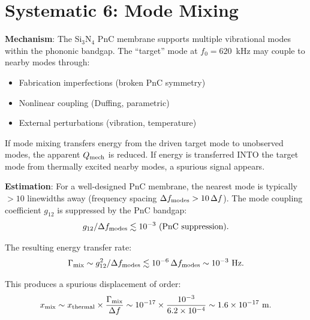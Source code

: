 \documentclass[11pt]{article}
\newcommand{\ee}[1]{\times 10^{#1}}
\newcommand{\Qmech}{Q_{\rm mech}}
\theoremstyle{definition}
\theoremstyle{remark}
\begin{document}
\section{Systematic 6: Mode Mixing}
\label{sec:mode_mixing}

\textbf{Mechanism}: The Si$_3$N$_4$ PnC membrane supports multiple
vibrational modes within the phononic bandgap. The ``target'' mode
at $f_0 = 620$~kHz may couple to nearby modes through:
\begin{itemize}[nosep]
\item Fabrication imperfections (broken PnC symmetry)
\item Nonlinear coupling (Duffing, parametric)
\item External perturbations (vibration, temperature)
\end{itemize}

If mode mixing transfers energy from the driven target mode to
unobserved modes, the apparent $\Qmech$ is reduced. If energy is
transferred INTO the target mode from thermally excited nearby modes,
a spurious signal appears.

\textbf{Estimation}: For a well-designed PnC membrane, the nearest
mode is typically $> 10$ linewidths away (frequency spacing
$\Delta f_{\rm modes} > 10\,\Delta f$). The mode coupling coefficient
$g_{12}$ is suppressed by the PnC bandgap:
\begin{equation}
g_{12}/\Delta f_{\rm modes} \lesssim 10^{-3}~\text{(PnC suppression)}.
\end{equation}

The resulting energy transfer rate:
\begin{equation}
\Gamma_{\rm mix} \sim g_{12}^2/\Delta f_{\rm modes}
\lesssim 10^{-6}\,\Delta f_{\rm modes} \sim 10^{-3}~\text{Hz}.
\end{equation}

This produces a spurious displacement of order:
\begin{equation}
x_{\rm mix} \sim x_{\rm thermal}\times
\frac{\Gamma_{\rm mix}}{\Delta f}
\sim 10^{-17}\times\frac{10^{-3}}{6.2\ee{-4}} \sim 1.6\ee{-17}~\text{m}.
\end{equation}
\end{document}
